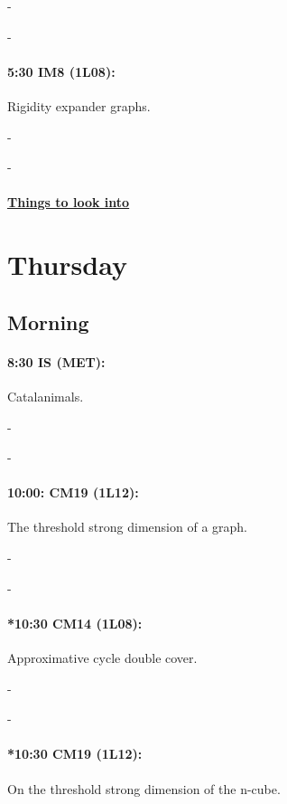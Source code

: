 \documentclass[12]{article}
\theoremstyle{definition}
\begin{document}
	-
	
	-
	
	\paragraph{5:30 IM8 (1L08):} Rigidity expander graphs.
	
	-
	
	-
	
	\begin{center} 
		\item\paragraph{\underline{Things to look into}}
	\end{center}

	
	
	\newpage
	\section{Thursday}
	
	\subsection{Morning}
	
	\paragraph{8:30 IS (MET):} Catalanimals.
	
	-
	
	-
	
	\paragraph{10:00: CM19 (1L12):} The threshold strong dimension of a graph.
	
	-
	
	-
	
	\paragraph{*10:30 CM14 (1L08):} Approximative cycle double cover.
	
	-
	
	-
	
	\paragraph{*10:30 CM19 (1L12):} On the threshold strong dimension of the n-cube.
	
\end{document}
